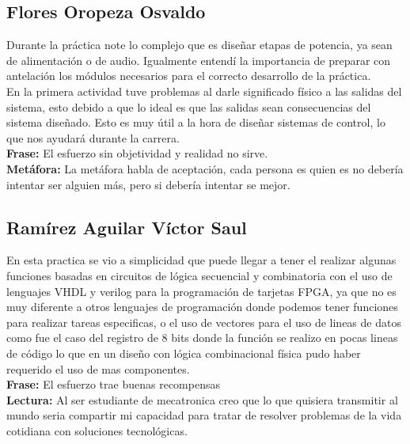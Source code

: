 
\subsection*{Flores Oropeza Osvaldo}
    Durante la práctica note lo complejo que es diseñar etapas de potencia, ya sean de alimentación o de audio. Igualmente entendí la importancia de preparar con antelación los módulos necesarios para el correcto desarrollo de la práctica. \\
    En la primera actividad tuve problemas al darle significado físico a las salidas del sistema, esto debido a que lo ideal es que las salidas sean consecuencias del sistema diseñado. Esto es muy útil a la hora de diseñar sistemas de control, lo que nos ayudará durante la carrera. \\
    \textcolor{Amarillo}{\textbf{Frase:}} El \textcolor{Amarillo}{esfuerzo} sin objetividad y realidad no sirve. \\
    \textcolor{Amarillo}{\textbf{Metáfora:}} La metáfora habla de aceptación, cada persona es quien es no debería intentar ser alguien más, pero si debería intentar se mejor.

\subsection*{Ramírez Aguilar Víctor Saul}
    En esta practica se vio a simplicidad que puede llegar a tener el realizar algunas funciones basadas en circuitos de lógica secuencial y combinatoria con el uso de lenguajes VHDL y verilog para la programación de tarjetas FPGA, ya que no es muy diferente a otros lenguajes de programación donde podemos tener funciones para realizar tareas especificas, o el uso de vectores para el uso de lineas de datos como fue el caso del registro de 8 bits donde la función se realizo en pocas lineas de código lo que en un diseño con lógica combinacional física pudo haber requerido el uso de mas componentes. \\
    \textcolor{Amarillo}{\textbf{Frase:}} El \textcolor{Amarillo}{esfuerzo} trae buenas recompensas\\
    \textcolor{Amarillo}{\textbf{Lectura:}} Al ser estudiante de mecatronica creo que lo que quisiera transmitir al mundo seria compartir mi capacidad para tratar de resolver problemas de la vida cotidiana con soluciones tecnológicas.   
    
